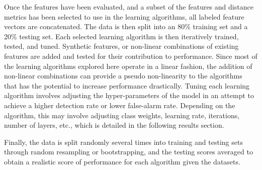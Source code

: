 Once the features have been evaluated, and a subset of the features and distance metrics has been selected to use in the learning algorithms, all labeled feature vectors are concatenated.
The data is then split into an 80\% training set and a 20\% testing set.
Each selected learning algorithm is then iteratively trained, tested, and tuned.
Synthetic features, or non-linear combinations of existing features are added and tested for their contribution to performance.
Since most of the learning algorithms explored here operate in a linear fashion, the addition of non-linear combinations can provide a pseudo non-linearity to the algorithms that has the potential to increase performance drastically.
Tuning each learning algorithm involves adjusting the hyper-parameters of the model in an attempt to achieve a higher detection rate or lower false-alarm rate.
Depending on the algorithm, this may involve adjusting class weights, learning rate, iterations, number of layers, etc., which is detailed in the following results section.

Finally, the data is split randomly several times into training and testing sets through random resampling or bootstrapping, and the testing scores averaged to obtain a realistic score of performance for each algorithm given the datasets.

